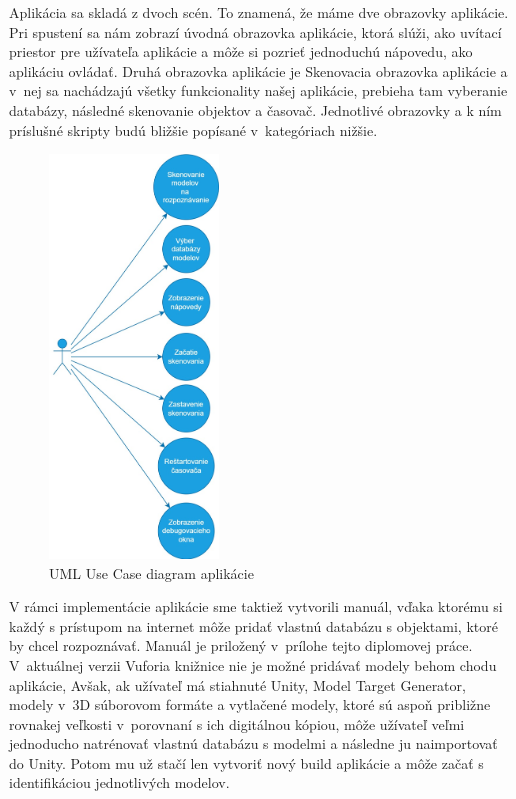 Aplikácia sa skladá z dvoch scén. To znamená, že máme dve obrazovky aplikácie. Pri spustení sa nám zobrazí úvodná obrazovka aplikácie, ktorá slúži, ako uvítací priestor pre užívateľa aplikácie a môže si pozrieť jednoduchú nápovedu, ako aplikáciu ovládať. Druhá obrazovka aplikácie je Skenovacia obrazovka aplikácie a v~nej sa nachádzajú všetky funkcionality našej aplikácie, prebieha tam vyberanie databázy, následné skenovanie objektov a časovač. Jednotlivé obrazovky a k ním príslušné skripty budú bližšie popísané v~kategóriach nižšie. 

\begin{figure}[h]
\centering
\includegraphics[width=0.4\textwidth]{img/use_case_diagram.jpg}
\caption{UML Use Case diagram aplikácie}
\label{fig:useCaseDiagram}
\end{figure}

V rámci implementácie aplikácie sme taktiež vytvorili manuál, vďaka ktorému si každý s prístupom na internet môže pridať vlastnú databázu s objektami, ktoré by chcel rozpoznávať. Manuál je priložený v~prílohe tejto diplomovej práce. V~aktuálnej verzii Vuforia knižnice nie je možné pridávať modely behom chodu aplikácie, Avšak, ak užívateľ má stiahnuté Unity, Model Target Generator, modely v~3D súborovom formáte a vytlačené modely, ktoré sú aspoň približne rovnakej veľkosti v~porovnaní s ich digitálnou kópiou, môže užívateľ veľmi jednoducho natrénovať vlastnú databázu s modelmi a následne ju naimportovať do Unity. Potom mu už stačí len vytvoriť nový build aplikácie a môže začať s identifikáciou jednotlivých modelov. 

